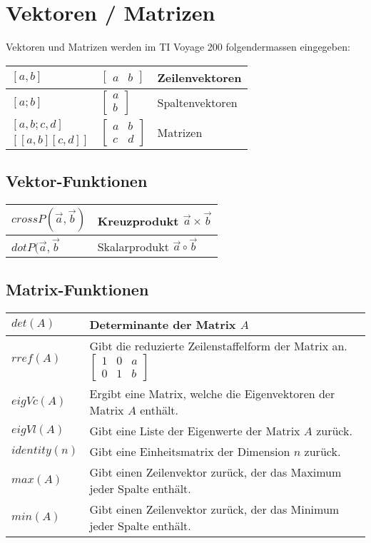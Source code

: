 \section{Vektoren / Matrizen}

Vektoren und Matrizen werden im TI Voyage 200 folgendermassen eingegeben: \\
\begin{tabular}{|l|l|l|}
	\hline
	$ [a,b] $ 			& $ \begin{bmatrix} a & b \end{bmatrix} $ 								& Zeilenvektoren \\ \hline
	$ [a;b] $			& $ \begin{bmatrix} a \\ b \end{bmatrix} $								& Spaltenvektoren \\ \hline
	$ [a,b;c,d] $		& \multirow{2}{*}{ $ \begin{bmatrix}a & b \\ c & d  \end{bmatrix} $ }	& \multirow{2}{*}{Matrizen}\\
	$ [[a,b][c,d]] $	&	& \\ \hline
\end{tabular}

\subsection{Vektor-Funktionen}
\begin{tabular}{|l|l|}
	\hline
	$crossP( \vec{a}, \vec{b})$		& Kreuzprodukt $\vec{a} \times \vec{b}$ \\ \hline
	$dotP( \vec{a}, \vec{b}$		& Skalarprodukt $\vec{a} \circ \vec{b}$ \\ \hline
\end{tabular}

\subsection{Matrix-Funktionen}
\begin{tabular}{|l|l|}
	\hline
	$det(A)$						& Determinante der Matrix $A$ \\ \hline
	$rref(A)$						& Gibt die reduzierte Zeilenstaffelform der Matrix an. $\begin{bmatrix}1&0&a \\ 0&1&b\end{bmatrix}$ \\ \hline
	$eigVc(A)$						& Ergibt eine Matrix, welche die Eigenvektoren der Matrix $A$ enthält. \\ \hline
	$eigVl(A)$						& Gibt eine Liste der Eigenwerte der Matrix $A$ zurück. \\ \hline
	$identity(n)$					& Gibt eine Einheitsmatrix der Dimension $n$ zurück. \\ \hline
	$max(A)$						& Gibt einen Zeilenvektor zurück, der das Maximum jeder Spalte enthält. \\ \hline
	$min(A)$						& Gibt einen Zeilenvektor zurück, der das Minimum jeder Spalte enthält. \\ \hline
\end{tabular}

